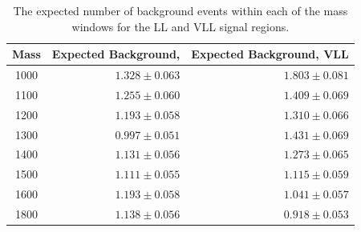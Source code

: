 \begin{table}
\centering
\begin{tabular}{crr}
  \hline
  Mass & Expected Background, \acs*({LL} & Expected Background, \acs*{VLL} \\
  \hline
  1000 & $1.328 \pm 0.063 $ & $1.803 \pm 0.081 $ \\
  1100 & $1.255 \pm 0.060 $ & $1.409 \pm 0.069 $ \\
  1200 & $1.193 \pm 0.058 $ & $1.310 \pm 0.066 $ \\
  1300 & $0.997 \pm 0.051 $ & $1.431 \pm 0.069 $ \\
  1400 & $1.131 \pm 0.056 $ & $1.273 \pm 0.065 $ \\
  1500 & $1.111 \pm 0.055 $ & $1.115 \pm 0.059 $ \\
  1600 & $1.193 \pm 0.058 $ & $1.041 \pm 0.057 $ \\
  1800 & $1.138 \pm 0.056 $ & $0.918 \pm 0.053 $ \\
  \hline
\end{tabular}
\caption{The expected number of background events within each of the mass windows for the \acs*{LL} and \acs*{VLL} signal regions.}
\label{tab:background_yields}
\end{table}

